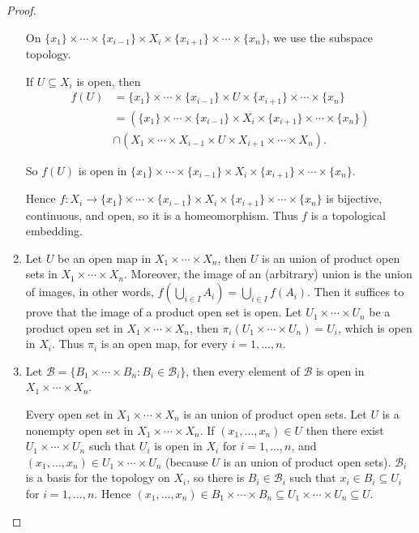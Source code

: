 \begin{proof}
\begin{enumerate}[label={(\alph*)}]
              On $\{ x_{1} \} \times \cdots \times \{ x_{i-1} \} \times X_{i} \times \{ x_{i+1} \} \times \cdots \times \{ x_{n} \}$, we use the subspace topology.

              If $U\subseteq X_{i}$ is open, then
              \begin{align*}
                  f(U) & = \{ x_{1} \} \times \cdots \times \{ x_{i-1} \} \times U \times \{ x_{i+1} \} \times \cdots \times \{ x_{n} \}                    \\
                       & = \left( \{ x_{1} \} \times \cdots \times \{ x_{i-1} \} \times X_{i} \times \{ x_{i+1} \} \times \cdots \times \{ x_{n} \} \right) \\
                       & \cap (X_{1}\times\cdots \times X_{i-1}\times U\times X_{i+1}\times \cdots \times X_{n}).
              \end{align*}

              So $f(U)$ is open in $\{ x_{1} \} \times \cdots \times \{ x_{i-1} \} \times X_{i} \times \{ x_{i+1} \} \times \cdots \times \{ x_{n} \}$.

              Hence $f: X_{i}\to \{ x_{1} \} \times \cdots \times \{ x_{i-1} \} \times X_{i} \times \{ x_{i+1} \} \times \cdots \times \{ x_{n} \}$ is bijective, continuous, and open, so it is a homeomorphism. Thus $f$ is a topological embedding.
        \item Let $U$ be an open map in $X_{1}\times\cdots\times X_{n}$, then $U$ is an union of product open sets in $X_{1}\times\cdots\times X_{n}$. Moreover, the image of an (arbitrary) union is the union of images, in other words, $f(\bigcup_{i\in I}A_{i}) = \bigcup_{i\in I}f(A_{i})$. Then it suffices to prove that the image of a product open set is open. Let $U_{1}\times\cdots \times U_{n}$ be a product open set in $X_{1}\times \cdots\times X_{n}$, then $\pi_{i}(U_{1}\times \cdots\times U_{n}) = U_{i}$, which is open in $X_{i}$. Thus $\pi_{i}$ is an open map, for every $i = 1,\ldots,n$.
        \item Let $\mathscr{B} = \{ B_{1}\times\cdots\times B_{n} : B_{i}\in\mathscr{B}_{i} \}$, then every element of $\mathscr{B}$ is open in $X_{1}\times \cdots \times X_{n}$.

              Every open set in $X_{1}\times\cdots\times X_{n}$ is an union of product open sets. Let $U$ is a nonempty open set in $X_{1}\times\cdots\times X_{n}$. If $(x_{1}, \ldots, x_{n})\in U$ then there exist $U_{1}\times \cdots\times U_{n}$ such that $U_{i}$ is open in $X_{i}$ for $i = 1,\ldots,n$, and $(x_{1}, \ldots, x_{n})\in U_{1}\times\cdots\times U_{n}$ (because $U$ is an union of product open sets). $\mathscr{B}_{i}$ is a basis for the topology on $X_{i}$, so there is $B_{i}\in\mathscr{B}_{i}$ such that $x_{i}\in B_{i}\subseteq U_{i}$ for $i = 1,\ldots,n$. Hence $(x_{1}, \ldots, x_{n})\in B_{1}\times\cdots\times B_{n} \subseteq U_{1}\times\cdots\times U_{n} \subseteq U$.


\end{enumerate}
\end{proof}
